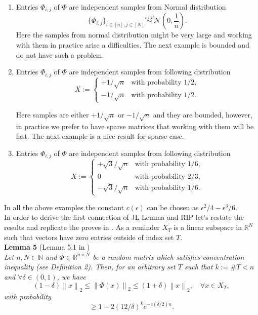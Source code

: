 \documentclass[twoside,11pt]{article}
\newcommand\norm[1]{\left\lVert#1\right\rVert}
\newcommand*\by{{\times}}
\begin{document}
\begin{enumerate}
    \item Entries $\Phi_{i, j}$ of $\Phi$ are independent samples from Normal distribution $$
    \{\Phi_{i, j}\}_{i \in [n], j \in [N]} \stackrel{i.i.d}{\sim} \mathcal{N}(0, \frac{1}{n}).
    $$
    Here the samples from normal distribution might be very large and working with them in practice arise a difficulties. The next example is bounded and do not have such a problem.
    \item Entries $\Phi_{i, j}$ of $\Phi$ are independent samples from following distribution 
    $$
    X :=\begin{cases}
         +1/\sqrt{n} & \text{with probability } 1/2, \\
         -1/\sqrt{n} & \text{with probability } 1/2.
    \end{cases}
    $$
    
    Here samples are either $+1/\sqrt{n}$ or $-1/\sqrt{n}$ and they are bounded, however, in practice we prefer to have sparse matrices that working with them will be fast. The next example is a nice result for sparse case.
    \item Entries $\Phi_{i, j}$ of $\Phi$ are independent samples from following distribution 
    $$
    X :=\begin{cases}
         +\sqrt{3}/\sqrt{n} & \text{with probability } 1/6, \\
         0 & \text{with probability } 2/3, \\
         -\sqrt{3}/\sqrt{n} & \text{with probability } 1/6.
    \end{cases}
    $$
\end{enumerate}
In all the above examples the constant $c(\epsilon)$ can be chosen as $\epsilon^2/4 - \epsilon^3/6$. \\

In order to derive the first connection of JL Lemma and RIP let's restate the results and replicate the proves in \citep{isometry}. As a reminder $X_T$ is a linear subspace in $\mathbb{R}^N$ such that vectors have zero entries outside of index set $T$. \\

\noindent
{\bf Lemma 5} (Lemma 5.1 in \citep{isometry}) \\
{\it 
Let $n, N \in \mathbb{N}$ and $\Phi \in \mathbb{R}^{n \by N}$ be a random matrix which satisfies concentration inequality (see Definition 2). Then, for an arbitrary set $T$
such that $k := \#T < n$ and $\forall \delta \in (0, 1)$, we have 
\begin{equation}
\label{eqn:iso1}    
(1 - \delta) \norm{x}_2 \leq \norm{\Phi(x)}_2 \leq (1 + \delta) \norm{x}_2, \quad \forall x \in X_T,
\end{equation}
with probability 
\begin{equation}
   \geq 1 - 2(12/\delta)^k e^{-c(\delta/2)n}.
\end{equation}
}
\end{document}
